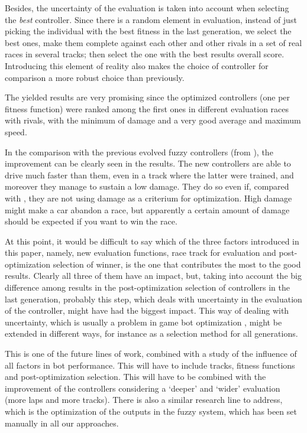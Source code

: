 \documentclass[conference]{IEEEtran}
\begin{document}
Besides, the uncertainty of the evaluation is taken into account when
selecting the {\em best} controller. Since there is a random element
in evaluation, instead of just picking the individual with the best fitness
in the last generation, we select the best ones, make them complete 
against each other and other rivals in a set of real races in several
tracks; then select the one
with the best results overall score. Introducing this element of reality also makes the
choice of controller for comparison a more robust choice than
previously. 

The yielded results are very promising since the optimized controllers
(one per fitness function) were ranked among the first ones in 
different evaluation races with rivals, with the minimum of damage and a very good average and maximum speed. 

In the comparison with the previous evolved fuzzy controllers (from \cite{evo18}), the improvement can be clearly seen in the results. The
new controllers are able to drive much faster than them, even in a
track where the latter were trained, and moreover they manage to
sustain a low damage. They do so even if, compared with
\cite{evo17,evo18}, they are not using damage as a criterium for
optimization. High damage might make a car abandon a race, but
apparently a certain amount of damage should be expected if you want
to win the race. 

At this point, it would be difficult to say which of the three factors
introduced in this paper, namely, new evaluation functions, race track
for evaluation and post-optimization selection of winner, is the one
that contributes the most to the good results. Clearly all three of
them have an impact, but, taking into account the big difference among
results in the post-optimization selection of controllers in the last
generation, probably this step, which deals with uncertainty in the
evaluation of the controller, might have had the biggest
impact. This way of dealing with uncertainty, which is usually a
problem in game bot optimization \cite{merelo2016statistical}, might
be extended in different ways, for instance as a selection method
for all generations.

This is one of the future lines of work, combined with a study of the
influence of all factors in bot performance. This will have to include
tracks, fitness functions and post-optimization selection. This will
have to be combined with the improvement of the controllers
considering a `deeper' and `wider' evaluation (more laps and more
tracks). There is also a similar research line to address, which is the
optimization of the outputs in the fuzzy system, which has been set
manually in all our approaches. 
\end{document}
